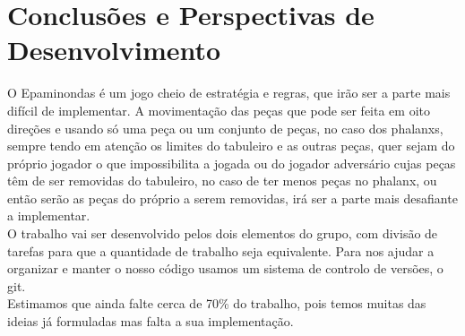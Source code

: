 \documentclass[a4paper]{article}
\begin{document}
\section{Conclusões e Perspectivas de Desenvolvimento}
O Epaminondas é um jogo cheio de estratégia e regras, que irão ser a parte mais difícil de implementar. A movimentação das peças que pode ser feita em oito direções e usando só uma peça ou um conjunto de peças, no caso dos phalanxs, sempre tendo em atenção os limites do tabuleiro e as outras peças, quer sejam do próprio jogador o que impossibilita a jogada ou do jogador adversário cujas peças têm de ser removidas do tabuleiro, no caso de ter menos peças no phalanx, ou então serão as peças do próprio a serem removidas, irá ser a parte mais desafiante a implementar.
\\\linebreak
O trabalho vai ser desenvolvido pelos dois elementos do grupo, com divisão de tarefas para que a quantidade de trabalho seja equivalente. Para nos ajudar a organizar e manter o nosso código usamos um sistema de controlo de versões, o git.
\\\linebreak
Estimamos que ainda falte cerca de 70\% do trabalho, pois temos muitas das ideias já formuladas mas falta a sua implementação.

\clearpage
{}
\renewcommand\refname{Bibliografia}


\end{document}
